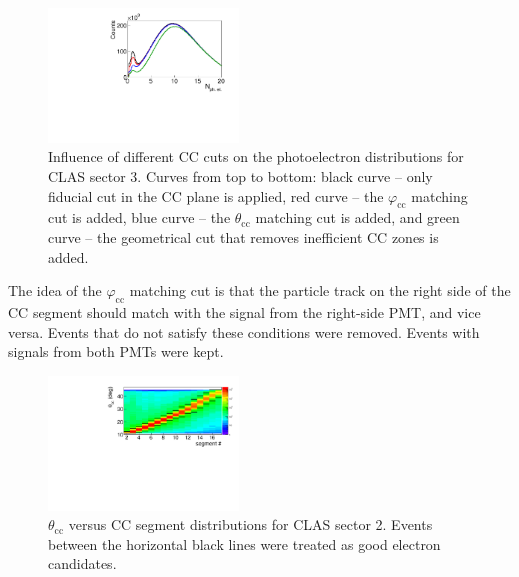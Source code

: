 \documentclass[prc,twocolumn,superscriptaddress,showpacs,amssymb,amsmath,amsfonts,aps,nofootinbib]{revtex4-1}
\begin{document}
\begin{figure}[htp]
\begin{center}
 \includegraphics[width=0.45\textwidth,keepaspectratio]{pictures/event_selection/photoel.pdf}
\vspace{-0.1cm}
\caption{Influence of different CC cuts on the photoelectron distributions for CLAS sector 3. Curves from top to bottom: black curve -- only fiducial cut in the CC plane is applied, red curve -- the $\varphi_{\text{cc}}$ matching cut is added, blue curve -- the $\theta_{\text{cc}}$ matching cut is added, and green curve -- the geometrical cut that removes inefficient CC zones is added.}
\label{fig:photoel}
\end{center}
\end{figure}



The idea of the $\varphi_{\text{cc}}$ matching cut is that the particle track on the right side of the CC segment should match with the signal from the right-side PMT, and vice versa. Events that do not satisfy these conditions were removed. Events with signals from both PMTs were kept.


\begin{figure}[htp]
\begin{center}
 \includegraphics[width=0.45\textwidth,keepaspectratio]{pictures/event_selection/th_vs_seg.pdf}
\vspace{-0.1cm}
\caption{$\theta_{\text{cc}}$ versus CC segment distributions for CLAS sector 2. Events between the horizontal black lines were treated as good electron candidates.}
\label{fig:th_vs_seg}
\end{center}
\end{figure}
\end{document}
